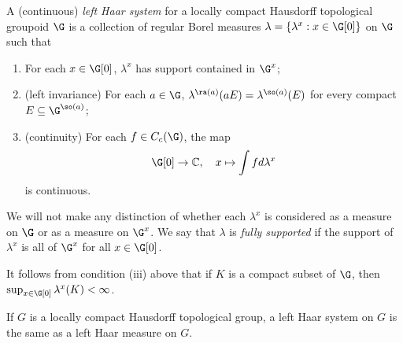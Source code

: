 \begin{definition}[{\cite[Definition 2.2]{MR584266}}]\label{definitionhaarsystem}
A (continuous) \emph{left Haar system} for a locally compact Hausdorff topological groupoid $\G$ is a collection of regular Borel measures $\lambda=\left\{\lambda^x:x\in\G[0]\right\}$ on $\G$ such that
\begin{enumerate}
\item[(i)] For each $x\in\G[0]$, $\lambda^x$ has support contained in $\G^x$;
\item[(ii)] (left invariance) For each $a\in\G$, $\lambda^{\ra(a)}(aE)=\lambda^{\so(a)}(E)$ for every compact $E\subseteq \G^{\so(a)}$;
\item[(iii)] (continuity) For each $f\in C_c(\G)$, the map
\[\G[0]\to\mathbb{C},\quad x\mapsto \int fd\lambda^x\]
is continuous.
\end{enumerate}
We will not make any distinction of whether each $\lambda^x$ is considered as a measure on $\G$ or as a measure on $\G^x$. We say that $\lambda$ is \emph{fully supported} if the support of $\lambda^x$ is all of $\G^x$ for all $x\in\G[0]$.
\end{definition}

\begin{remark}\label{remarkhaarsystemshavefinitecompactvalues}
It follows from condition (iii) above that if $K$ is a compact subset of $\G$, then $\sup_{x\in\G[0]}\lambda^x(K)<\infty$.%
%
\end{remark}

\begin{example}
If $G$ is a locally compact Hausdorff topological group, a left Haar system on $G$ is the same as a left Haar measure on $G$.
\end{example}


